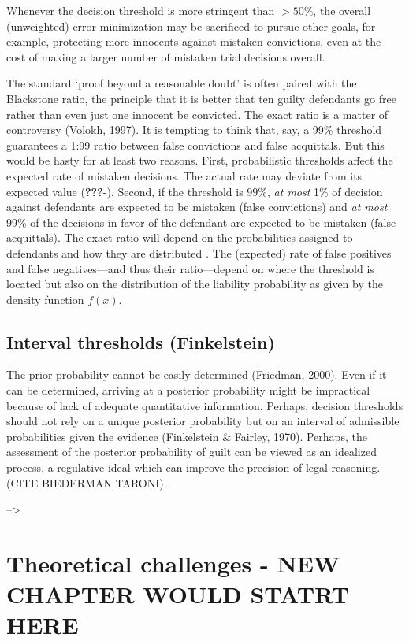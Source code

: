 \documentclass[10pt,dvipsnames,enabledeprecatedfontcommands]{scrartcl}
\begin{document}
Whenever the decision threshold is more stringent than \(>50\%\), the
overall (unweighted) error minimization may be sacrificed to pursue
other goals, for example, protecting more innocents against mistaken
convictions, even at the cost of making a larger number of mistaken
trial decisions overall.

The standard `proof beyond a reasonable doubt' is often paired with the
Blackstone ratio, the principle that it is better that ten guilty
defendants go free rather than even just one innocent be convicted. The
exact ratio is a matter of controversy (Volokh, 1997). It is tempting to
think that, say, a 99\% threshold guarantees a 1:99 ratio between false
convictions and false acquittals. But this would be hasty for at least
two reasons. First, probabilistic thresholds affect the expected rate of
mistaken decisions. The actual rate may deviate from its expected value
({\textbf{???}}-). Second, if the threshold is \(99\%\),
\textit{at most} 1\% of decision against defendants are expected to be
mistaken (false convictions) and \textit{at most} 99\% of the decisions
in favor of the defendant are expected to be mistaken (false
acquittals). The exact ratio will depend on the probabilities assigned
to defendants and how they are distributed \citep{allen2014}. The
(expected) rate of false positives and false negatives---and thus their
ratio---depend on where the threshold is located but also on the
distribution of the liability probability as given by the density
function \(f(x)\).

\subsection{Interval thresholds
(Finkelstein)}\label{interval-thresholds-finkelstein}

The prior probability cannot be easily determined (Friedman, 2000). Even
if it can be determined, arriving at a posterior probability might be
impractical because of lack of adequate quantitative information.
Perhaps, decision thresholds should not rely on a unique posterior
probability but on an interval of admissible probabilities given the
evidence (Finkelstein \& Fairley, 1970). Perhaps, the assessment of the
posterior probability of guilt can be viewed as an idealized process, a
regulative ideal which can improve the precision of legal reasoning.
(CITE BIEDERMAN TARONI).

--\textgreater{}

\section{Theoretical challenges - NEW CHAPTER WOULD STATRT
HERE}\label{theoretical-challenges---new-chapter-would-statrt-here}
\end{document}
